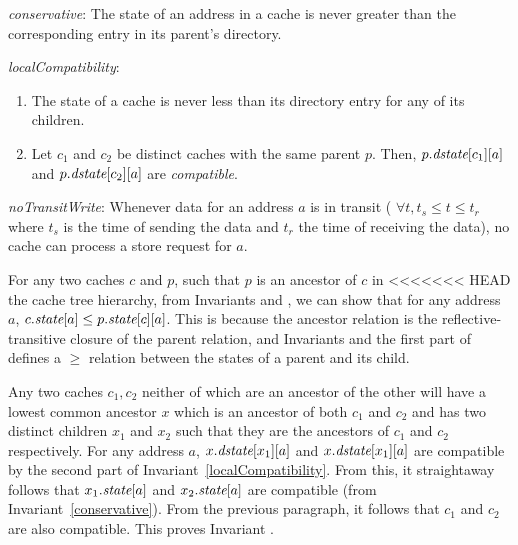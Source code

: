 \begin{inv}
\textit{conservative}: The state of an address in a cache is never greater than
the corresponding entry in its parent's directory.
\label{conservative}
\end{inv}

\begin{inv}
\textit{localCompatibility}:
\begin{enumerate}
\item The state of a cache is never less than its directory entry for any of
its children.
\item Let $c_1$ and $c_2$ be distinct caches with the same parent $p$. Then,
$p.\textit{dstate}[c_1][a]$ and $p.\textit{dstate}[c_2][a]$ are \textit{compatible}.
\end{enumerate}
\label{localCompatibility}
\end{inv}

\begin{inv}
\textit{noTransitWrite}: Whenever data for an address $a$ is in transit (\ie{}
$\forall t, t_s \le t \le t_r$ where $t_s$ is the time of sending the data and
$t_r$ the time of receiving the data), no cache can process a store request for
$a$.
\label{noTransitWrite}
\end{inv}

For any two caches $c$ and $p$, such that $p$ is an ancestor of $c$ in
<<<<<<< HEAD
the cache tree hierarchy, from Invariants  and
, we can show that for any address $a$,
$c.\textit{state}[a] \le p.\textit{state}[c][a]$. This is because the ancestor
relation is the reflective-transitive closure of the parent relation,
and Invariants  and the first part
 of defines a $\ge$ relation between the
states of a parent and its child.

Any two caches $c_1, c_2$ neither of which are an ancestor of the
other will have a lowest common ancestor $x$ which is an ancestor of
both $c_1$ and $c_2$ and has two distinct children $x_1$ and $x_2$
such that they are the ancestors of $c_1$ and $c_2$ respectively. For
any address $a$, $x.\textit{dstate}[x_1][a]$ and $x.\textit{dstate}[x_1][a]$ are
compatible by the second part of
Invariant~\ref{localCompatibility}. From this, it straightaway follows
that $x_1.\textit{state}[a]$ and $x_2.\textit{state}[a]$ are compatible (from
Invariant~\ref{conservative}). From the previous paragraph, it follows
that $c_1$ and $c_2$ are also compatible. This proves
Invariant .


